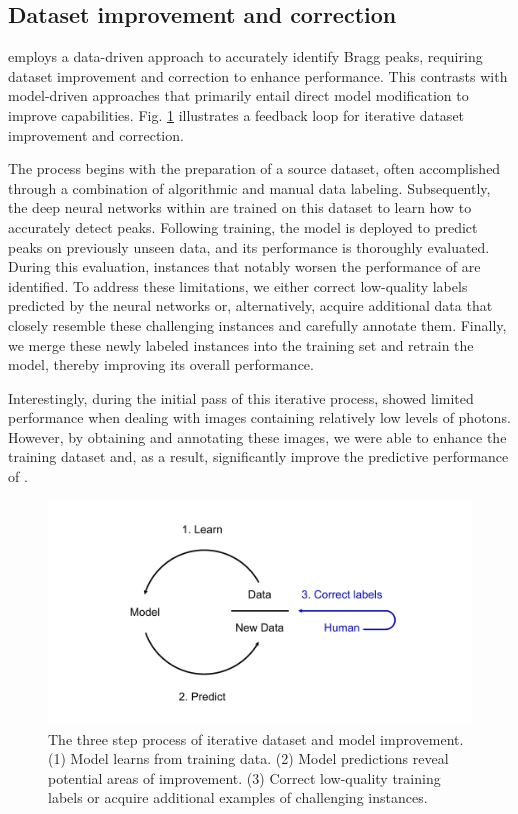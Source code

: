 \documentclass[a4paper]{article}
\begin{document}
\subsection{Dataset improvement and correction}

\peaknet{} employs a data-driven approach to accurately identify Bragg peaks, requiring dataset improvement and correction to enhance performance.  This contrasts with model-driven approaches that primarily entail direct model modification to improve capabilities.  Fig. \ref{fig : data engine} illustrates a feedback loop for iterative dataset improvement and correction.  

The process begins with the preparation of a source dataset, often accomplished through a combination of algorithmic and manual data labeling.  Subsequently, the deep neural networks within \peaknet{} are trained on this dataset to learn how to accurately detect peaks.  Following training, the model is deployed to predict peaks on previously unseen data, and its performance is thoroughly evaluated.  During this evaluation, instances that notably worsen the performance of \peaknet{} are identified.  To address these limitations, we either correct low-quality labels predicted by the neural networks or, alternatively, acquire additional data that closely resemble these challenging instances and carefully annotate them.  Finally, we merge these newly labeled instances into the training set and retrain the model, thereby improving its overall performance.  

Interestingly, during the initial pass of this iterative process, \peaknet{} showed limited performance when dealing with images containing relatively low levels of photons.  However, by obtaining and annotating these images, we were able to enhance the training dataset and, as a result, significantly improve the predictive performance of \peaknet{}.


\begin{figure}[!ht]
\centering
\includegraphics[width=\columnwidth,keepaspectratio,trim={1in 0in 1in 0in}]
{./figures/data_engine.pdf}
\caption{The three step process of iterative dataset and model improvement. (1) Model learns from training data. (2) Model predictions reveal potential areas of improvement. (3) Correct low-quality training labels or acquire additional examples of challenging instances.}
\label{fig : data engine}
\end{figure}
\end{document}
